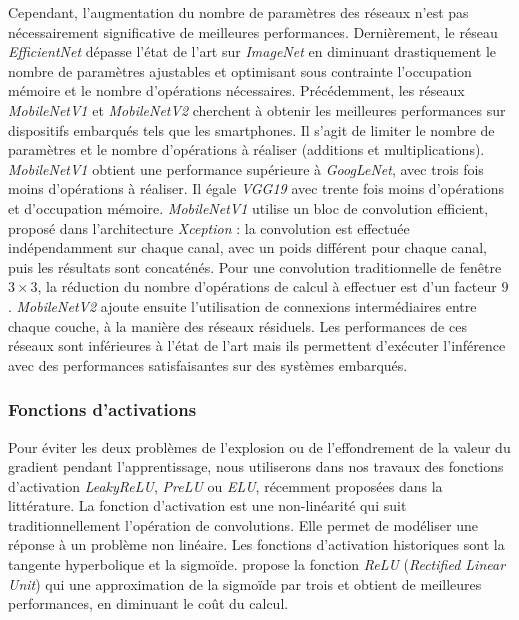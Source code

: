 Cependant, l'augmentation du nombre de paramètres des réseaux n'est pas nécessairement significative de meilleures performances.
Dernièrement, le réseau \textit{EfficientNet} dépasse l'état de l'art sur \textit{ImageNet} en diminuant drastiquement le nombre de paramètres ajustables et optimisant sous contrainte l'occupation mémoire et le nombre d'opérations nécessaires.
Précédemment, les réseaux \textit{MobileNetV1} \cite{howard_mobilenets_2017} et \textit{MobileNetV2} \cite{sandler_mobilenetv2_2018} cherchent à obtenir les meilleures performances sur dispositifs embarqués tels que les smartphones.
Il s'agit de limiter le nombre de paramètres et le nombre d'opérations à réaliser (additions et multiplications).
\textit{MobileNetV1} obtient une performance supérieure à \textit{GoogLeNet}, avec trois fois moins d'opérations à réaliser.
Il égale \textit{VGG19} avec trente fois moins d'opérations et d'occupation mémoire.
\textit{MobileNetV1} utilise un bloc de convolution efficient, proposé dans l'architecture \textit{Xception} \cite{chollet_xception_2016} : la convolution est effectuée indépendamment sur chaque canal, avec un poids différent pour chaque canal, puis les résultats sont concaténés.
Pour une convolution traditionnelle de fenêtre $3 \times 3$, la réduction du nombre d'opérations de calcul à effectuer est d'un facteur $9$.
\textit{MobileNetV2} ajoute ensuite l'utilisation de connexions intermédiaires entre chaque couche, à la manière des réseaux résiduels.
Les performances de ces réseaux sont inférieures à l'état de l'art mais ils permettent d'exécuter l'inférence avec des performances satisfaisantes sur des systèmes embarqués.

\subsubsection{Fonctions d'activations} \label{subsubsec:activation}
Pour éviter les deux problèmes de l'explosion ou de l'effondrement de la valeur du gradient pendant l'apprentissage, nous utiliserons dans nos travaux des fonctions d'activation \textit{LeakyReLU}, \textit{PreLU} ou \textit{ELU}, récemment proposées dans la littérature.
La fonction d'activation est une non-linéarité qui suit traditionnellement l'opération de convolutions.
Elle permet de modéliser une réponse à un problème non linéaire.
Les fonctions d'activation historiques sont la tangente hyperbolique et la sigmoïde.
\cite{nair_rectified_2010} propose la fonction \textit{ReLU} (\textit{Rectified Linear Unit}) qui une approximation de la sigmoïde par trois et obtient de meilleures performances, en diminuant le coût du calcul.

